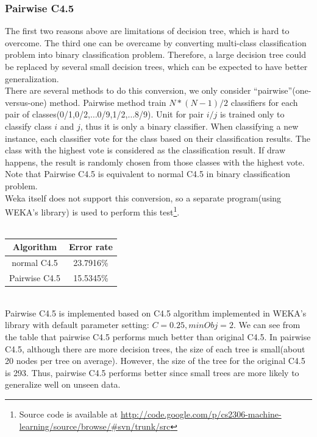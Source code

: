 \documentclass[a4paper,11pt]{article}
\begin{document}
\subsubsection{Pairwise C4.5}
The first two reasons above are limitations of decision tree, which is hard to overcome. The third one can be overcame by converting multi-class classification problem into binary classification problem. Therefore, a large decision tree could be replaced by several small decision trees, which can be expected to have better generalization.\\
There are several methods to do this conversion, we only consider ``pairwise''(one-versus-one) method. Pairwise method train $N*(N-1)/2$ classifiers for each pair of classes(0/1,0/2,$\ldots$0/9,1/2,$\ldots$8/9). Unit for pair $i/j$ is trained only to classify class $i$ and $j$, thus it is only a binary classifier. When classifying a new instance, each classifier vote for the class based on their classification results. The class with the highest vote is considered as the classification result. If draw happens, the result is randomly chosen from those classes with the highest vote. Note that Pairwise C4.5 is equivalent to normal C4.5 in binary classification problem.\\
Weka itself does not support this conversion, so a separate program(using WEKA's library) is used to perform this test\footnote{Source code is available at \url{http://code.google.com/p/cs2306-machine-learning/source/browse/#svn/trunk/src}}.\\
\vspace{0.5cm}\\
\begin{tabular}{c c}
Algorithm	& Error rate\\
\hline \hline
normal C4.5	& 23.7916\%\\
Pairwise C4.5	& 15.5345\%\\
\end{tabular}
\vspace{0.5cm}\\
Pairwise C4.5 is implemented based on C4.5 algorithm implemented in WEKA's library with default parameter setting: $C=0.25,minObj=2$. We can see from the table that pairwise C4.5 performs much better than original C4.5. In pairwise C4.5, although there are more decision trees, the size of each tree is small(about 20 nodes per tree on average). However, the size of the tree for the original C4.5 is 293. Thus, pairwise C4.5 performs better since small trees are more likely to generalize well on unseen data.
\end{document}
